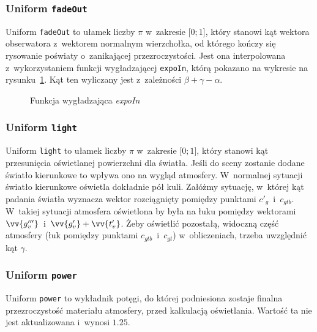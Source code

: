 \subsubsection{Uniform \texttt{fadeOut}}
Uniform \texttt{fadeOut} to ułamek liczby $\pi$ w~zakresie $\lbrack0; 1\rbrack$, który stanowi kąt wektora obserwatora z~wektorem normalnym wierzchołka, od którego kończy się rysowanie poświaty o~zanikającej przezroczystości. Jest ona interpolowana z~wykorzystaniem funkcji wygładzającej \texttt{expoIn}, którą pokazano na wykresie na rysunku~\ref{fig:c4_expoIn}. Kąt ten wyliczany jest z~zależności $\beta+\gamma-\alpha$.
\begin{figure}[h]
  \centering
  \caption{Funkcja wygładzająca \textit{expoIn}}
  \label{fig:c4_expoIn}
\end{figure}
\subsubsection{Uniform \texttt{light}}
Uniform \texttt{light} to ułamek liczby $\pi$ w~zakresie $\lbrack0; 1\rbrack$, który stanowi kąt przesunięcia oświetlanej powierzchni dla światła. Jeśli do sceny zostanie dodane światło kierunkowe to wpływa ono na wygląd atmosfery. W~normalnej sytuacji światło kierunkowe oświetla dokładnie pół kuli. Załóżmy sytuację, w~której kąt padania światła wyznacza wektor rozciągnięty pomiędzy punktami $c'_g$~i~$c_{gtb}$. W~takiej sytuacji atmosfera oświetlona by była na łuku pomiędzy wektorami $\vv {g'''_v}$~i~$\vv {g'_v} + \vv{t'_v}$. Żeby oświetlić pozostałą, widoczną część atmosfery (łuk pomiędzy punktami $c_{gtb}$~i~$c_{gt}$) w~obliczeniach, trzeba uwzględnić kąt $\gamma$.

\subsubsection{Uniform \texttt{power}}
Uniform \texttt{power} to wykładnik potęgi, do której podniesiona zostaje finalna przezroczystość materiału atmosfery, przed kalkulacją oświetlania. Wartość ta nie jest aktualizowana i~wynosi $1.25$.

